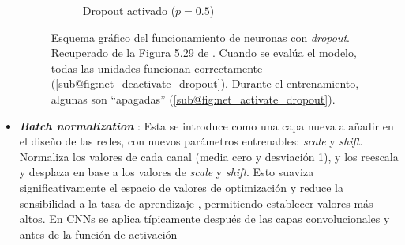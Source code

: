 \begin{itemize}
\begin{figure}[htbp]
\begin{subfigure}[b]{0.45\textwidth}
            \caption{Dropout activado ($p=0.5$)}
            \label{fig:net_activate_dropout}
        \end{subfigure}

        \caption[
            Esquema gráfico del funcionamiento de neuronas con \textit{dropout}.
        ]{
            Esquema gráfico del funcionamiento de neuronas con \textit{dropout}.
            Recuperado de la Figura 5.29 de \cite{szeliski2010}.
            Cuando se evalúa el modelo, todas las unidades funcionan correctamente (\ref{sub@fig:net_deactivate_dropout}). Durante el entrenamiento, algunas son ``apagadas'' (\ref{sub@fig:net_activate_dropout}). 
        }
        \label{fig:net_with_dropout}
    \end{figure}
    
    \item \textbf{\textit{Batch normalization}} \cite{ioffe2015}: Esta se introduce como una capa nueva a 
    añadir en el diseño de las redes, con nuevos parámetros entrenables: \textit{scale} y \textit{shift}. 
    Normaliza los valores de cada canal (media cero y desviación 1), y los reescala y desplaza en base a los
    valores de \textit{scale} y \textit{shift}. 
    Esto suaviza significativamente el espacio de valores de optimización \cite{santurkar2019} y reduce la 
    sensibilidad a la tasa de aprendizaje \cite{arora2018}, permitiendo establecer valores más altos.
    En CNNs se aplica típicamente después de las capas convolucionales y antes de la función de activación
    
\end{itemize}




